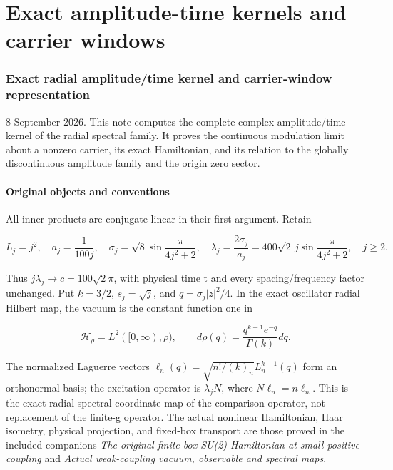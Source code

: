 \documentclass[
  11pt,
]{article}
\begin{document}
\clearpage
\part{Exact amplitude-time kernels and carrier windows}
\section{Exact radial amplitude/time kernel and carrier-window
representation}\label{weak-coupling-part-5-exact-radial-amplitudetime-kernel-and-carrier-window-representation}

8 September 2026. This note computes the complete complex amplitude/time
kernel of the radial spectral family. It proves the continuous
modulation limit about a nonzero carrier, its exact Hamiltonian, and its
relation to the globally discontinuous amplitude family and the origin
zero sector.

\subsection{Original objects and
conventions}\label{weak-coupling-part-5-original-objects-and-conventions}

All inner products are conjugate linear in their first argument. Retain

\[
 L_j=j^2,\quad a_j=\frac1{100j},\quad
 \sigma_j=\sqrt8\sin\frac{\pi}{4j^2+2},\quad
 \lambda_j=\frac{2\sigma_j}{a_j}
 =400\sqrt2\,j\sin\frac{\pi}{4j^2+2},\quad j\ge2.
\]

Thus \(j\lambda_j\to c=100\sqrt2\pi\), with physical time t and every
spacing/frequency factor unchanged. Put \(k=3/2\), \(s_j=\sqrt j\), and
\(q=\sigma_j|z|^2/4\). In the exact oscillator radial Hilbert map, the
vacuum is the constant function one in

\[
 \mathcal H_\rho=L^2([0,\infty),\rho),\qquad
 d\rho(q)=\frac{q^{k-1}e^{-q}}{\Gamma(k)}dq.
\]

The normalized Laguerre vectors
\(\ell_n(q)=\sqrt{n!/(k)_n}L_n^{k-1}(q)\) form an orthonormal basis; the
excitation operator is \(\lambda_j N\), where \(N\ell_n=n\ell_n\). This
is the exact radial spectral-coordinate map of the comparison operator,
not replacement of the finite-g operator. The actual nonlinear
Hamiltonian, Haar isometry, physical projection, and fixed-box transport
are those proved in the included companions \emph{The original
finite-box SU(2) Hamiltonian at small positive coupling} and
\emph{Actual weak-coupling vacuum, observable and spectral maps}.
\end{document}
